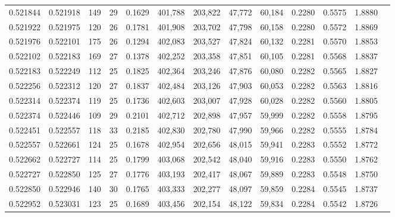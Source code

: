 \begin{tabular}{rrrrrrrrrrrrr}
0.521844 & 0.521918 & 149 &  29 &                                     0.1629 & 401,788 & 203,822 &  47,772 &  60,184 & 0.2280 & 0.5575 & 1.8880 \\
0.521922 & 0.521975 & 120 &  26 &                                     0.1781 & 401,908 & 203,702 &  47,798 &  60,158 & 0.2280 & 0.5572 & 1.8869 \\
0.521976 & 0.522101 & 175 &  26 &                                     0.1294 & 402,083 & 203,527 &  47,824 &  60,132 & 0.2281 & 0.5570 & 1.8853 \\
0.522102 & 0.522183 & 169 &  27 &                                     0.1378 & 402,252 & 203,358 &  47,851 &  60,105 & 0.2281 & 0.5568 & 1.8837 \\
0.522183 & 0.522249 & 112 &  25 &                                     0.1825 & 402,364 & 203,246 &  47,876 &  60,080 & 0.2282 & 0.5565 & 1.8827 \\
0.522256 & 0.522312 & 120 &  27 &                                     0.1837 & 402,484 & 203,126 &  47,903 &  60,053 & 0.2282 & 0.5563 & 1.8816 \\
0.522314 & 0.522374 & 119 &  25 &                                     0.1736 & 402,603 & 203,007 &  47,928 &  60,028 & 0.2282 & 0.5560 & 1.8805 \\
0.522374 & 0.522446 & 109 &  29 &                                     0.2101 & 402,712 & 202,898 &  47,957 &  59,999 & 0.2282 & 0.5558 & 1.8795 \\
0.522451 & 0.522557 & 118 &  33 &                                     0.2185 & 402,830 & 202,780 &  47,990 &  59,966 & 0.2282 & 0.5555 & 1.8784 \\
0.522557 & 0.522661 & 124 &  25 &                                     0.1678 & 402,954 & 202,656 &  48,015 &  59,941 & 0.2283 & 0.5552 & 1.8772 \\
0.522662 & 0.522727 & 114 &  25 &                                     0.1799 & 403,068 & 202,542 &  48,040 &  59,916 & 0.2283 & 0.5550 & 1.8762 \\
0.522727 & 0.522850 & 125 &  27 &                                     0.1776 & 403,193 & 202,417 &  48,067 &  59,889 & 0.2283 & 0.5548 & 1.8750 \\
0.522850 & 0.522946 & 140 &  30 &                                     0.1765 & 403,333 & 202,277 &  48,097 &  59,859 & 0.2284 & 0.5545 & 1.8737 \\
0.522952 & 0.523031 & 123 &  25 &                                     0.1689 & 403,456 & 202,154 &  48,122 &  59,834 & 0.2284 & 0.5542 & 1.8726 \\

\end{tabular}

